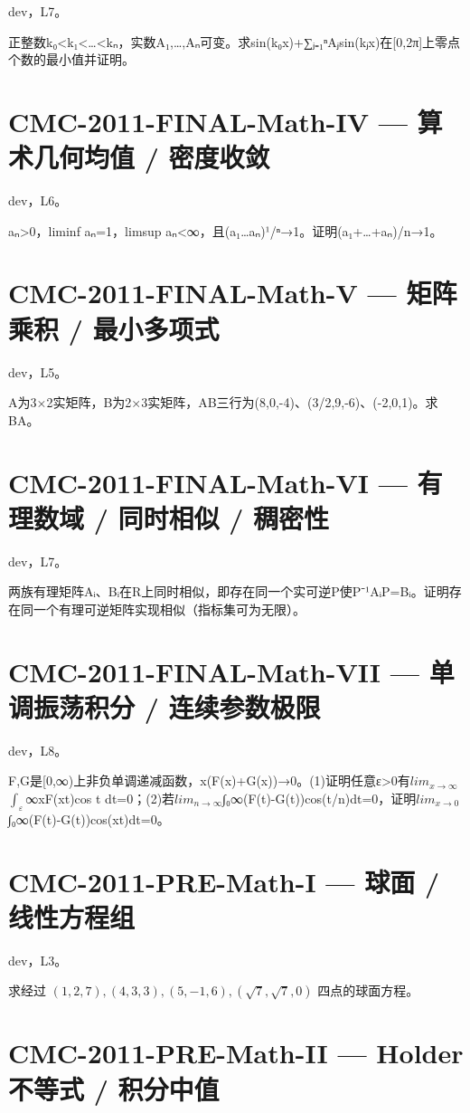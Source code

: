 \documentclass[UTF8]{ctexart}
\begin{document}
dev，L7。

正整数k₀<k₁<…<kₙ，实数A₁,…,Aₙ可变。求sin(k₀x)+∑ⱼ₌₁ⁿAⱼsin(kⱼx)在[0,2π]上零点个数的最小值并证明。

\section*{CMC-2011-FINAL-Math-IV — 算术几何均值 / 密度收敛}

dev，L6。

aₙ>0，liminf aₙ=1，limsup aₙ<∞，且(a₁…aₙ)¹/ⁿ→1。证明(a₁+…+aₙ)/n→1。

\section*{CMC-2011-FINAL-Math-V — 矩阵乘积 / 最小多项式}

dev，L5。

A为3×2实矩阵，B为2×3实矩阵，AB三行为(8,0,-4)、(3/2,9,-6)、(-2,0,1)。求BA。

\section*{CMC-2011-FINAL-Math-VI — 有理数域 / 同时相似 / 稠密性}

dev，L7。

两族有理矩阵{Aᵢ}、{Bᵢ}在R上同时相似，即存在同一个实可逆P使P⁻¹AᵢP=Bᵢ。证明存在同一个有理可逆矩阵实现相似（指标集可为无限）。

\section*{CMC-2011-FINAL-Math-VII — 单调振荡积分 / 连续参数极限}

dev，L8。

F,G是[0,∞)上非负单调递减函数，x(F(x)+G(x))→0。(1)证明任意ε>0有$lim_{x→∞}$$∫_ε$∞xF(xt)cos t dt=0；(2)若$lim_{n→∞}$∫₀∞(F(t)-G(t))cos(t/n)dt=0，证明$lim_{x→0}$∫₀∞(F(t)-G(t))cos(xt)dt=0。

\section*{CMC-2011-PRE-Math-I — 球面 / 线性方程组}

dev，L3。

求经过 $(1,2,7),(4,3,3),(5,-1,6),(\sqrt7,\sqrt7,0)$ 四点的球面方程。

\section*{CMC-2011-PRE-Math-II — Holder不等式 / 积分中值}
\end{document}
